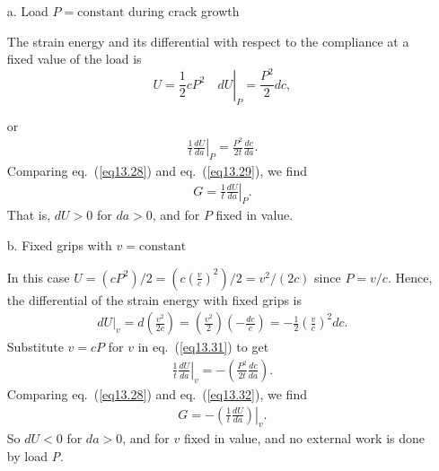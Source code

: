\documentclass{AeroStructure-ERJohnson}
\begin{document}
\begin{enumerate}
\item[a.] Load $P= \textrm{constant}$ during crack growth\vspace*{7pt}


The strain energy and its differential with respect to the compliance at a fixed value of the load is
\begin{equation*}
U=\left.\frac{1}{2} c P^{2} \quad d U\right|_{P}=\frac{P^{2}}{2} d c,
\end{equation*}
\vspace*{2pt}
\pagebreak

\noindent or
\begin{align}\label{eq13.29}
\left.\frac{1}{t} \frac{d U}{d a}\right|_{P}=\frac{P^{2}}{2 t} \frac{d c}{d a}.
\end{align}
Comparing eq.~(\ref{eq13.28}) and eq.~(\ref{eq13.29}), we find
\begin{align}\label{eq13.30}
G=\left.\frac{1}{t} \frac{d U}{d a}\right|_{P}.
\end{align}
That is, $d U>0$ for $d a>0$, and for $P$ fixed in value.\vspace*{4pt}

\item[b.] Fixed grips with $v = \textrm{constant}$\vspace*{7pt}

In this case $U=\left(c P^{2}\right) / 2=\left(c\left(\frac{v}{c}\right)^{2}\right) / 2=v^{2} /(2 c)$ since $P=v / c$. Hence, the differential of the strain energy with fixed grips is
\begin{align}\label{eq13.31}
\left.d U\right|_{v}=d\left(\frac{v^{2}}{2 c}\right)=\left(\frac{v^{2}}{2}\right)\left(-\frac{d c}{c}\right)=-\frac{1}{2}\left(\frac{v}{c}\right)^{2} d c.
\end{align}
Substitute $v=c P$ for $v$ in eq.~(\ref{eq13.31}) to get
\begin{align}\label{eq13.32}
\left.\frac{1}{t} \frac{d U}{d a}\right|_{v}=-\left(\frac{P^{2}}{2 t} \frac{d c}{d a}\right).
\end{align}
Comparing eq.~(\ref{eq13.28}) and eq.~(\ref{eq13.32}), we find
\begin{align}\label{eq13.33}
G=-\left.\left(\frac{1}{t} \frac{d U}{d a}\right)\right|_{v}.
\end{align}
So $d U<0$ for $d a>0$, and for $v$ fixed in value, and no external work is done by load \textit{P}.
\end{enumerate}
\end{document}

